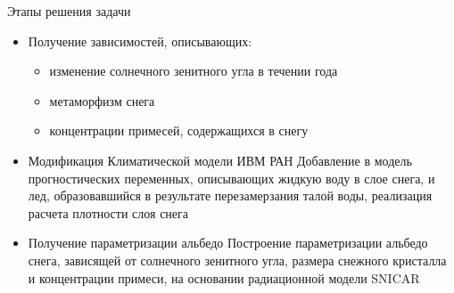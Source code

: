 \documentclass[unicode]{beamer}
\begin{document}
\begin{frame}{Этапы решения задачи}
    \footnotesize    
    
    \begin{itemize}
        \item<1-3>[]\begin{block}{Получение зависимостей, описывающих:}
            \begin{itemize}
                \item изменение солнечного зенитного угла в течении года
                \item метаморфизм снега
                \item концентрации примесей, содержащихся в снегу
            \end{itemize}
        \end{block}

        \item<2-3>[]\begin{block}{Модификация Климатической модели ИВМ РАН}
            Добавление в модель прогностических переменных, описывающих жидкую воду в слое снега, и лед, образовавшийся в результате перезамерзания талой воды, реализация расчета плотности слоя снега
        \end{block}
    
        \item<3->[]\begin{block}{Получение параметризации альбедо}
            Построение параметризации альбедо снега, зависящей от солнечного зенитного угла, размера снежного кристалла и концентрации примеси, на основании радиационной модели SNICAR
        \end{block}
    \end{itemize}

\end{frame}
\end{document}
